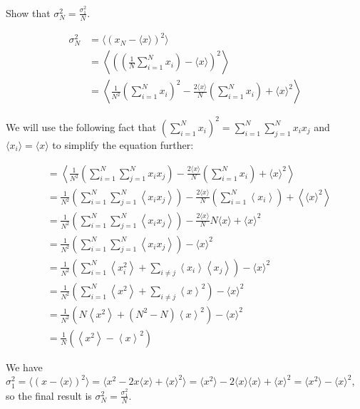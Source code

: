 \begin{texample}
	Show that $\sigma_N^2=\frac{\sigma_1^2}{N}$.
	
	\begin{align*}
		\sigma_N^2 &= \langle (x_N - \langle x \rangle)^2 \rangle \\
		&= \left\langle \left(\left( \frac{1}{N}\sum_{i=1}^N x_i \right) - \langle x \rangle\right)^2 \right\rangle \\
		&= \left\langle \frac{1}{N^2}\left( \sum_{i=1}^N x_i \right)^2 - \frac{2 \langle x \rangle}{N} \left( \sum_{i=1}^N x_i \right) + \langle x \rangle^2 \right\rangle
	\end{align*}
	
	We will use the following fact that $\left( \sum_{i=1}^N x_i \right)^2 = \sum_{i=1}^N \sum_{j=1}^N x_i x_j$ and $\langle x_i \rangle = \langle x \rangle$ to simplify the equation further:
	
	\begin{align*}
		&= \left\langle \frac{1}{N^2}\left( \sum_{i=1}^N \sum_{j=1}^N x_i x_j \right) - \frac{2 \langle x \rangle}{N} \left( \sum_{i=1}^N x_i \right) + \langle x \rangle^2 \right\rangle \\
		&= \frac{1}{N^2}\left( \sum_{i=1}^N \sum_{j=1}^N \left\langle x_i x_j \right\rangle \right) - \frac{2 \langle x \rangle}{N} \left( \sum_{i=1}^N \left\langle x_i \right\rangle \right) + \left\langle \langle x \rangle^2 \right\rangle \\
		&= \frac{1}{N^2}\left( \sum_{i=1}^N \sum_{j=1}^N \left\langle x_i x_j \right\rangle \right) - \frac{2 \langle x \rangle}{N} N\langle x \rangle + \langle x \rangle^2 \\
		&= \frac{1}{N^2}\left( \sum_{i=1}^N \sum_{j=1}^N \left\langle x_i x_j \right\rangle \right) - \langle x \rangle^2 \\
		&= \frac{1}{N^2}\left( \sum_{i=1}^N \left\langle x_i^2 \right\rangle + \sum_{i \ne j} \left\langle x_i \right\rangle \left\langle x_j \right\rangle \right) - \langle x \rangle^2 \\
		&= \frac{1}{N^2}\left( \sum_{i=1}^N \left\langle x^2 \right\rangle + \sum_{i \ne j} \left\langle x \right\rangle^2 \right) - \langle x \rangle^2 \\
		&= \frac{1}{N^2}\left( N \left\langle x^2 \right\rangle + (N^2-N) \left\langle x \right\rangle^2 \right) - \langle x \rangle^2 \\
		&= \frac{1}{N} (\left\langle x^2 \right\rangle -\left\langle x \right\rangle^2)
	\end{align*}
	
	We have $\sigma_1^2 = \langle (x- \langle x \rangle)^2 \rangle = \langle x^{2} - 2x\langle x \rangle + \langle x \rangle^2 \rangle = \langle x^2 \rangle - 2 \langle x \rangle \langle x \rangle + \langle x \rangle^2=\langle x^2 \rangle - \langle x \rangle^2$, so the final result is $\sigma_N^2=\frac{\sigma_1^2}{N}$.
\end{texample}

